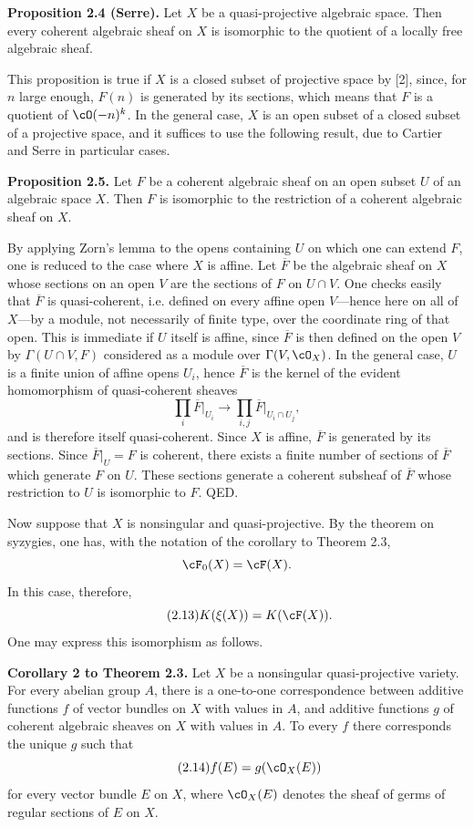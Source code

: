 \textbf{Proposition 2.4 (Serre).} Let $X$ be a quasi-projective algebraic space. Then every coherent algebraic sheaf on $X$ is isomorphic to the quotient of a locally free algebraic sheaf.

This proposition is true if $X$ is a closed subset of projective space by [2], since, for $n$ large enough, $F(n)$ is generated by its sections, which means that $F$ is a quotient of $\cO(-n)^k$. In the general case, $X$ is an open subset of a closed subset of a projective space, and it suffices to use the following result, due to Cartier and Serre in particular cases.

\textbf{Proposition 2.5.} Let $F$ be a coherent algebraic sheaf on an open subset $U$ of an algebraic space $X$. Then $F$ is isomorphic to the restriction of a coherent algebraic sheaf on $X$.

By applying Zorn's lemma to the opens containing $U$ on which one can extend $F$, one is reduced to the case where $X$ is affine. Let $\overline F$ be the algebraic sheaf on $X$ whose sections on an open $V$ are the sections of $F$ on $U\cap V$. One checks easily that $\overline F$ is quasi-coherent, i.e. defined on every affine open $V$---hence here on all of $X$---by a module, not necessarily of finite type, over the coordinate ring of that open. This is immediate if $U$ itself is affine, since $\overline F$ is then defined on the open $V$ by $\Gamma(U\cap V,F)$ considered as a module over $\Gamma(V,\cO_X)$. In the general case, $U$ is a finite union of affine opens $U_i$, hence $\overline F$ is the kernel of the evident homomorphism of quasi-coherent sheaves
\[
 \prod_i \overline F\big|_{U_i}\longrightarrow \prod_{i,j}\overline F\big|_{U_i\cap U_j},
\]
and is therefore itself quasi-coherent. Since $X$ is affine, $\overline F$ is generated by its sections. Since $\overline F|_U=F$ is coherent, there exists a finite number of sections of $\overline F$ which generate $F$ on $U$. These sections generate a coherent subsheaf of $\overline F$ whose restriction to $U$ is isomorphic to $F$. QED.

Now suppose that $X$ is nonsingular and quasi-projective. By the theorem on syzygies, one has, with the notation of the corollary to Theorem 2.3,
\[
 \cF_0(X)=\cF(X).
\]
In this case, therefore,
\begin{equation}\tag{2.13}
 K(\xi(X))=K(\cF(X)).
\end{equation}
One may express this isomorphism as follows.

\textbf{Corollary 2 to Theorem 2.3.} Let $X$ be a nonsingular quasi-projective variety. For every abelian group $A$, there is a one-to-one correspondence between additive functions $f$ of vector bundles on $X$ with values in $A$, and additive functions $g$ of coherent algebraic sheaves on $X$ with values in $A$. To every $f$ there corresponds the unique $g$ such that
\begin{equation}\tag{2.14}
 f(E)=g(\cO_X(E))
\end{equation}
for every vector bundle $E$ on $X$, where $\cO_X(E)$ denotes the sheaf of germs of regular sections of $E$ on $X$.

